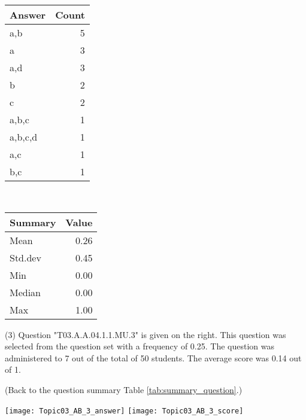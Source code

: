 \documentclass[12pt,english,nohyper]{tufte-handout}\usepackage[]{graphicx}\usepackage[]{color}
\begin{document}
\begin{center}%
\begin{tabular}{lr}
  \hline
Answer & Count \\ 
  \hline
a,b &   5 \\ 
  a &   3 \\ 
  a,d &   3 \\ 
  b &   2 \\ 
  c &   2 \\ 
  a,b,c &   1 \\ 
  a,b,c,d &   1 \\ 
  a,c &   1 \\ 
  b,c &   1 \\ 
   \hline
\end{tabular}
~~~~~~~~%
\begin{tabular}{lr}
  \hline
Summary & Value \\ 
  \hline
Mean & 0.26 \\ 
  Std.dev & 0.45 \\ 
  Min & 0.00 \\ 
  Median & 0.00 \\ 
  Max & 1.00 \\ 
   \hline
\end{tabular}
\end{center}\newpage{} (3) Question "T03.A.A.04.1.1.MU.3" is given on the right. This question was selected from the question set with a frequency of 0.25. The question was administered to 7 out of the total of 50 students. The average score was 0.14 out of 1.

 (Back to the question summary Table \ref{tab:summary_question}.)

\begin{center} \texttt{[image: Topic03\_AB\_3\_answer]} \texttt{[image: Topic03\_AB\_3\_score]} \end{center} 
\end{document}
